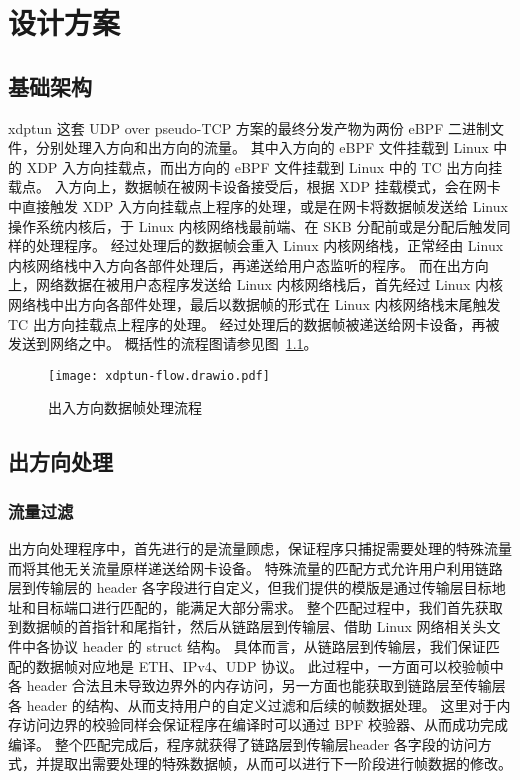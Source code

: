 

\chapter{设计方案}

\section{基础架构}

xdptun 这套 UDP over pseudo-TCP 方案的最终分发产物为两份 eBPF 二进制文件，分别处理入方向和出方向的流量。
其中入方向的 eBPF 文件挂载到 Linux 中的 XDP 入方向挂载点，而出方向的 eBPF 文件挂载到 Linux 中的 TC 出方向挂载点。
入方向上，数据帧在被网卡设备接受后，根据 XDP 挂载模式，会在网卡中直接触发 XDP 入方向挂载点上程序的处理，或是在网卡将数据帧发送给 Linux 操作系统内核后，于 Linux 内核网络栈最前端、在 SKB 分配前或是分配后触发同样的处理程序。
经过处理后的数据帧会重入 Linux 内核网络栈，正常经由 Linux 内核网络栈中入方向各部件处理后，再递送给用户态监听的程序。
而在出方向上，网络数据在被用户态程序发送给 Linux 内核网络栈后，首先经过 Linux 内核网络栈中出方向各部件处理，最后以数据帧的形式在 Linux 内核网络栈末尾触发 TC 出方向挂载点上程序的处理。
经过处理后的数据帧被递送给网卡设备，再被发送到网络之中。
概括性的流程图请参见图~\ref{fig:flow}。

\begin{figure}[h]
  \centering
  \texttt{[image: xdptun-flow.drawio.pdf]}
  \caption{出入方向数据帧处理流程}
  \label{fig:flow}
\end{figure}

\section{出方向处理}

\subsection{流量过滤}

出方向处理程序中，首先进行的是流量顾虑，保证程序只捕捉需要处理的特殊流量而将其他无关流量原样递送给网卡设备。
特殊流量的匹配方式允许用户利用链路层到传输层的 header 各字段进行自定义，但我们提供的模版是通过传输层目标地址和目标端口进行匹配的，能满足大部分需求。
整个匹配过程中，我们首先获取到数据帧的首指针和尾指针，然后从链路层到传输层、借助 Linux 网络相关头文件中各协议 header 的 struct 结构。
具体而言，从链路层到传输层，我们保证匹配的数据帧对应地是 ETH、IPv4、UDP 协议。
此过程中，一方面可以校验帧中各 header 合法且未导致边界外的内存访问，另一方面也能获取到链路层至传输层各 header 的结构、从而支持用户的自定义过滤和后续的帧数据处理。
这里对于内存访问边界的校验同样会保证程序在编译时可以通过 BPF 校验器、从而成功完成编译。
整个匹配完成后，程序就获得了链路层到传输层header 各字段的访问方式，并提取出需要处理的特殊数据帧，从而可以进行下一阶段进行帧数据的修改。

